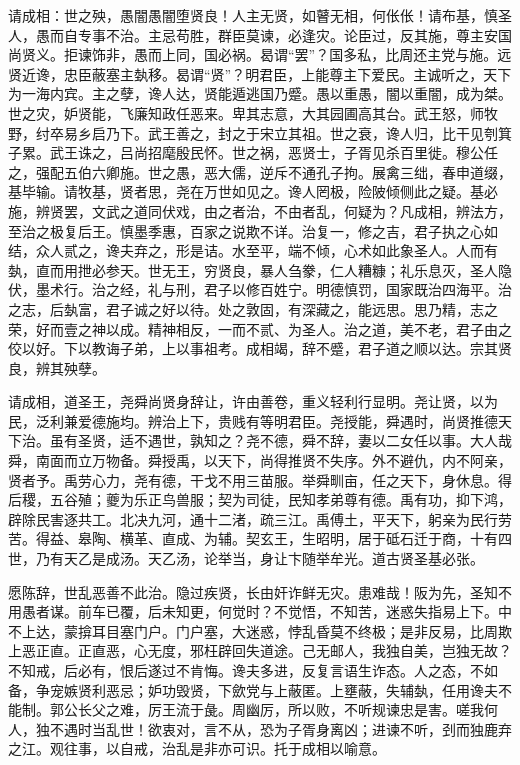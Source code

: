 \documentclass[]{article}
\begin{document}
请成相：世之殃，愚闇愚闇堕贤良！人主无贤，如瞽无相，何伥伥！请布基，慎圣人，愚而自专事不治。主忌苟胜，群臣莫谏，必逢灾。论臣过，反其施，尊主安国尚贤义。拒谏饰非，愚而上同，国必祸。曷谓``罢''？国多私，比周还主党与施。远贤近谗，忠臣蔽塞主埶移。曷谓``贤''？明君臣，上能尊主下爱民。主诚听之，天下为一海内宾。主之孽，谗人达，贤能遁逃国乃蹙。愚以重愚，闇以重闇，成为桀。世之灾，妒贤能，飞廉知政任恶来。卑其志意，大其园圃高其台。武王怒，师牧野，纣卒易乡启乃下。武王善之，封之于宋立其祖。世之衰，谗人归，比干见刳箕子累。武王诛之，吕尚招麾殷民怀。世之祸，恶贤士，子胥见杀百里徙。穆公任之，强配五伯六卿施。世之愚，恶大儒，逆斥不通孔子拘。展禽三绌，春申道缀，基毕输。请牧基，贤者思，尧在万世如见之。谗人罔极，险陂倾侧此之疑。基必施，辨贤罢，文武之道同伏戏，由之者治，不由者乱，何疑为？凡成相，辨法方，至治之极复后王。慎墨季惠，百家之说欺不详。治复一，修之吉，君子执之心如结，众人贰之，谗夫弃之，形是诘。水至平，端不倾，心术如此象圣人。人而有埶，直而用抴必参天。世无王，穷贤良，暴人刍豢，仁人糟糠；礼乐息灭，圣人隐伏，墨术行。治之经，礼与刑，君子以修百姓宁。明德慎罚，国家既治四海平。治之志，后埶富，君子诚之好以待。处之敦固，有深藏之，能远思。思乃精，志之荣，好而壹之神以成。精神相反，一而不贰、为圣人。治之道，美不老，君子由之佼以好。下以教诲子弟，上以事祖考。成相竭，辞不蹙，君子道之顺以达。宗其贤良，辨其殃孽。

请成相，道圣王，尧舜尚贤身辞让，许由善卷，重义轻利行显明。尧让贤，以为民，泛利兼爱德施均。辨治上下，贵贱有等明君臣。尧授能，舜遇时，尚贤推德天下治。虽有圣贤，适不遇世，孰知之？尧不德，舜不辞，妻以二女任以事。大人哉舜，南面而立万物备。舜授禹，以天下，尚得推贤不失序。外不避仇，内不阿亲，贤者予。禹劳心力，尧有德，干戈不用三苗服。举舜甽亩，任之天下，身休息。得后稷，五谷殖；夔为乐正鸟兽服；契为司徒，民知孝弟尊有德。禹有功，抑下鸿，辟除民害逐共工。北决九河，通十二渚，疏三江。禹傅土，平天下，躬亲为民行劳苦。得益、皋陶、横革、直成、为辅。契玄王，生昭明，居于砥石迁于商，十有四世，乃有天乙是成汤。天乙汤，论举当，身让卞随举牟光。道古贤圣基必张。

愿陈辞，世乱恶善不此治。隐过疾贤，长由奸诈鲜无灾。患难哉！阪为先，圣知不用愚者谋。前车已覆，后未知更，何觉时？不觉悟，不知苦，迷惑失指易上下。中不上达，蒙揜耳目塞门户。门户塞，大迷惑，悖乱昏莫不终极；是非反易，比周欺上恶正直。正直恶，心无度，邪枉辟回失道途。己无邮人，我独自美，岂独无故？不知戒，后必有，恨后遂过不肯悔。谗夫多进，反复言语生诈态。人之态，不如备，争宠嫉贤利恶忌；妒功毁贤，下歛党与上蔽匿。上壅蔽，失辅埶，任用谗夫不能制。郭公长父之难，厉王流于彘。周幽厉，所以败，不听规谏忠是害。嗟我何人，独不遇时当乱世！欲衷对，言不从，恐为子胥身离凶；进谏不听，刭而独鹿弃之江。观往事，以自戒，治乱是非亦可识。托于成相以喻意。
\end{document}
